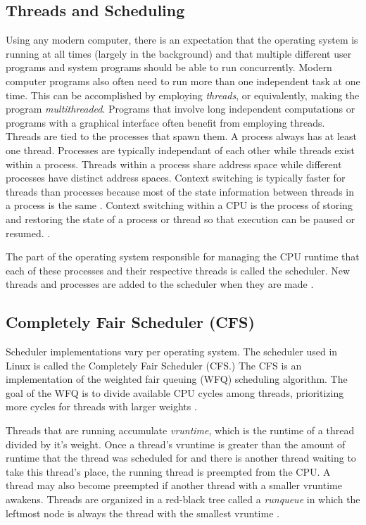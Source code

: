 \documentclass{sig-alternate}
\begin{document}
\subsection{Threads and Scheduling}
\label{sec:threads}
Using any modern computer, there is an expectation that the operating system is running at all times (largely in the background) and that multiple different user programs and system programs should be able to run concurrently. Modern computer programs also often need to run more than one independent task at one time. This can be accomplished by employing \emph{threads}, or equivalently, making the program \emph{multithreaded}. Programs that involve long independent computations or programs with a graphical interface often benefit from employing threads. Threads are tied to the processes that spawn them. A process always has at least one thread. Processes are typically independant of each other while threads exist within a process. Threads within a process share address space while different processes have distinct address spaces. Context switching is typically faster for threads than processes because most of the state information between threads in a process is the same \cite{WikiThreads}. Context switching within a CPU is the process of storing and restoring the state of a process or thread so that execution can be paused or resumed. \cite{WikiContext}.

The part of the operating system responsible for managing the CPU runtime that each of these processes and their respective threads is called the scheduler. New threads and processes are added to the scheduler when they are made \cite{Lozi:2016}.

\subsection{Completely Fair Scheduler (CFS)}
\label{sec:cfs}

Scheduler implementations vary per operating system. The scheduler used in Linux is called the Completely Fair Scheduler (CFS.) The CFS is an implementation of the weighted fair queuing (WFQ) scheduling algorithm. The goal of the WFQ is to divide available CPU cycles among threads, prioritizing more cycles for threads with larger weights \cite{Lozi:2016}. 

Threads that are running accumulate \emph{vruntime}, which is the runtime of a thread divided by it's weight. Once a thread's vruntime is greater than the amount of runtime that the thread was scheduled for and there is another thread waiting to take this thread's place, the running thread is preempted from the CPU. A thread may also become preempted if another thread with a smaller vruntime awakens. Threads are organized in a red-black tree called a \emph{runqueue} in which the leftmost node is always the thread with the smallest vruntime \cite{Lozi:2016}.
\end{document}
